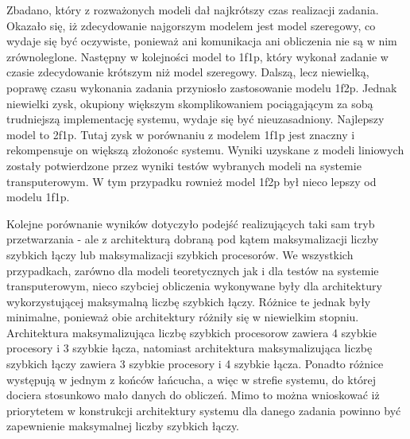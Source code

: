 \documentclass[a4paper,11pt, titlepage]{article}
\begin{document}
Zbadano, który z rozważonych modeli dał najkrótszy czas realizacji zadania. Okazało się, iż zdecydowanie najgorszym modelem jest model szeregowy, co wydaje się być oczywiste, ponieważ ani komunikacja ani obliczenia nie są w nim zrównoleglone. Następny w kolejności model to 1f1p, który wykonał zadanie w czasie zdecydowanie krótszym niż model szeregowy. Dalszą, lecz niewielką, poprawę czasu wykonania zadania przyniosło zastosowanie modelu 1f2p. Jednak niewielki zysk, okupiony większym skomplikowaniem pociągającym za sobą trudniejszą implementację systemu, wydaje się być nieuzasadniony. Najlepszy model to 2f1p. Tutaj zysk w porównaniu z modelem 1f1p jest znaczny i rekompensuje on większą złożonośc systemu. Wyniki uzyskane z modeli liniowych zostały potwierdzone przez wyniki testów wybranych modeli na systemie transputerowym. W tym przypadku rownież model 1f2p był nieco lepszy od modelu 1f1p.

Kolejne porównanie wyników dotyczyło podejść realizujących taki sam tryb przetwarzania - ale z architekturą dobraną pod kątem maksymalizacji liczby szybkich łączy lub maksymalizacji szybkich procesorów. We wszystkich przypadkach, zarówno dla modeli teoretycznych jak i dla testów na systemie transputerowym, nieco szybciej obliczenia wykonywane były dla architektury wykorzystującej maksymalną liczbę szybkich łączy. Różnice te jednak były minimalne, ponieważ obie architektury różniły się w niewielkim stopniu. Architektura maksymalizująca liczbę szybkich procesorow zawiera 4 szybkie procesory i 3 szybkie łącza, natomiast architektura maksymalizująca liczbę szybkich łączy zawiera 3 szybkie procesory i 4 szybkie łącza. Ponadto różnice występują w jednym z końców łańcucha, a więc w strefie systemu, do której dociera stosunkowo mało danych do obliczeń. Mimo to można wnioskować iż priorytetem w konstrukcji architektury systemu dla danego zadania powinno być zapewnienie maksymalnej liczby szybkich łączy.
\end{document}
